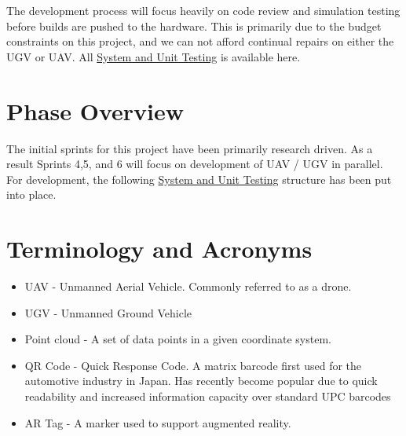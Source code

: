 The development process will focus heavily on code review and simulation testing before builds are pushed to the hardware.  This is primarily due to the budget constraints on this project, and we can not afford continual repairs on either the UGV or UAV.  All \hyperlink{testing}{System and Unit Testing} is available here.


\section{Phase  Overview}

The initial sprints for this project have been primarily research driven.  As a result Sprints 4,5, and 6 will focus on development of UAV / UGV in parallel.  For development, the following \hyperlink{testing}{System and Unit Testing} structure has been put into place.

\section{Terminology and Acronyms}
\begin{itemize}
	\item UAV - Unmanned Aerial Vehicle. Commonly referred to as a drone.
	\item UGV - Unmanned Ground Vehicle
	\item Point cloud - A set of data points in a given coordinate system.
	\item QR Code - Quick Response Code. A matrix barcode first used for the automotive industry in Japan. Has recently become popular due to quick readability and increased information capacity over standard UPC barcodes
	\item AR Tag - A marker used to support augmented reality.
\end{itemize}
